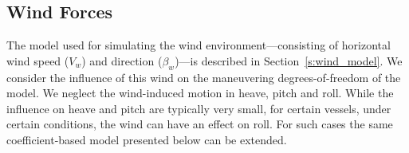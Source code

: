 \documentclass[utf8]{frontiersSCNS} %
\begin{document}

\subsection{Wind Forces}
The model used for simulating the wind environment---consisting of horizontal wind speed ($V_w$) and direction ($\beta_w$)---is described in Section~\ref{s:wind_model}.  We consider the influence of this wind on the maneuvering degrees-of-freedom of the model.  We neglect the wind-induced motion in heave, pitch and roll.  While the influence on heave and pitch are typically very small, for certain vessels, under certain conditions, the wind can have an effect on roll.  For such cases the same coefficient-based model presented below can be extended.
\end{document}

